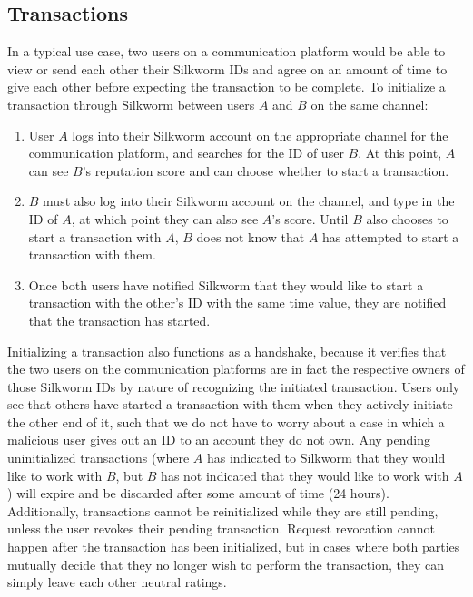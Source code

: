 \documentclass[letterpaper,twocolumn,10pt]{article}
\begin{document}
\subsection{Transactions}
In a typical use case, two users on a communication platform would be able to view or send each other their Silkworm IDs and agree on an amount of time to give each other before expecting the transaction to be complete. To initialize a transaction through Silkworm between users $A$ and $B$ on the same channel:
\begin{enumerate}
    \item User $A$ logs into their Silkworm account on the appropriate channel for the communication platform, and searches for the ID of user $B$. At this point, $A$ can see $B$'s reputation score and can choose whether to start a transaction.
    \item $B$ must also log into their Silkworm account on the channel, and type in the ID of $A$, at which point they can also see $A$'s score. Until $B$ also chooses to start a transaction with $A$, $B$ does not know that $A$ has attempted to start a transaction with them.
    \item Once both users have notified Silkworm that they would like to start a transaction with the other's ID with the same time value, they are notified that the transaction has started.
\end{enumerate} 
Initializing a transaction also functions as a handshake, because it verifies that the two users on the communication platforms are in fact the respective owners of those Silkworm IDs by nature of recognizing the initiated transaction. Users only see that others have started a transaction with them when they actively initiate the other end of it, such that we do not have to worry about a case in which a malicious user gives out an ID to an account they do not own. Any pending uninitialized transactions (where $A$ has indicated to Silkworm that they would like to work with $B$, but $B$ has not indicated that they would like to work with $A$) will expire and be discarded after some amount of time (24 hours). Additionally, transactions cannot be reinitialized while they are still pending, unless the user revokes their pending transaction. Request revocation cannot happen after the transaction has been initialized, but in cases where both parties mutually decide that they no longer wish to perform the transaction, they can simply leave each other neutral ratings.  
\end{document}
